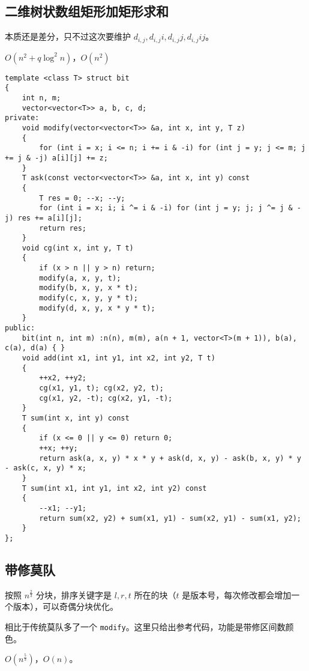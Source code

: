 \documentclass[12pt]{ctexart}
\begin{document}
\subsection{二维树状数组矩形加矩形求和}

本质还是差分，只不过这次要维护 $d_{i,j},d_{i,j}i,d_{i,j}j,d_{i,j}ij$。

$O(n^2+q\log^2n)$，$O(n^2)$

\begin{lstlisting}
template <class T> struct bit
{
	int n, m;
	vector<vector<T>> a, b, c, d;
private:
	void modify(vector<vector<T>> &a, int x, int y, T z)
	{
		for (int i = x; i <= n; i += i & -i) for (int j = y; j <= m; j += j & -j) a[i][j] += z;
	}
	T ask(const vector<vector<T>> &a, int x, int y) const
	{
		T res = 0; --x; --y;
		for (int i = x; i; i ^= i & -i) for (int j = y; j; j ^= j & -j) res += a[i][j];
		return res;
	}
	void cg(int x, int y, T t)
	{
		if (x > n || y > n) return;
		modify(a, x, y, t);
		modify(b, x, y, x * t);
		modify(c, x, y, y * t);
		modify(d, x, y, x * y * t);
	}
public:
	bit(int n, int m) :n(n), m(m), a(n + 1, vector<T>(m + 1)), b(a), c(a), d(a) { }
	void add(int x1, int y1, int x2, int y2, T t)
	{
		++x2, ++y2;
		cg(x1, y1, t); cg(x2, y2, t);
		cg(x1, y2, -t); cg(x2, y1, -t);
	}
	T sum(int x, int y) const
	{
		if (x <= 0 || y <= 0) return 0;
		++x; ++y;
		return ask(a, x, y) * x * y + ask(d, x, y) - ask(b, x, y) * y - ask(c, x, y) * x;
	}
	T sum(int x1, int y1, int x2, int y2) const
	{
		--x1; --y1;
		return sum(x2, y2) + sum(x1, y1) - sum(x2, y1) - sum(x1, y2);
	}
};
\end{lstlisting}

\subsection{带修莫队}

按照 $n^{\frac{2}{3}}$ 分块，排序关键字是 $l,r,t$ 所在的块（$t$ 是版本号，每次修改都会增加一个版本），可以奇偶分块优化。

相比于传统莫队多了一个 \verb|modify|。这里只给出参考代码，功能是带修区间数颜色。

$O(n^{\frac {5}{3}})$，$O(n)$。
\end{document}
